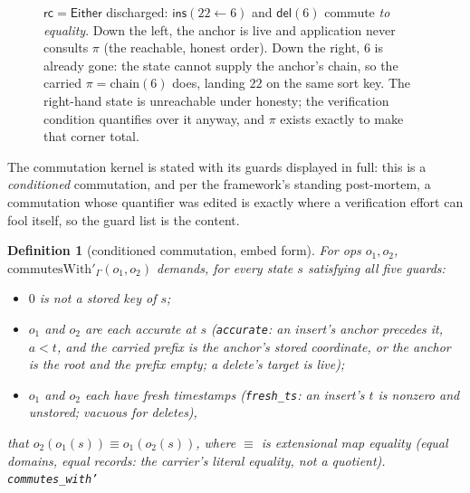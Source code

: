 \documentclass[11pt]{article}
\newtheorem{definition}[theorem]{Definition}
\newcommand{\rcrel}{\mathsf{rc}}                 %
\newcommand{\lean}[1]{\texttt{#1}}
\newcommand{\del}{\mathsf{del}}
\newcommand{\ins}{\mathsf{ins}}
\newcommand{\Either}{\textsf{Either}}
\newcommand{\chain}{\mathrm{chain}}
\begin{document}
\begin{figure}[h]
\centering
{}
\caption{$\rcrel = \Either$ discharged: $\ins(22 \leftarrow 6)$ and
$\del(6)$ commute \emph{to equality}. Down the left, the anchor is
live and application never consults $\pi$ (the reachable, honest
order). Down the right, $6$ is already gone: the state cannot
supply the anchor's chain, so the carried $\pi = \chain(6)$ does,
landing $22$ on the same sort key. The right-hand state is
unreachable under honesty; the verification condition quantifies
over it anyway, and $\pi$ exists exactly to make that corner total.}
\label{fig:commute}
\end{figure}

The commutation kernel is stated with its guards displayed in full:
this is a \emph{conditioned} commutation, and per the framework's
standing post-mortem, a commutation whose quantifier was edited is
exactly where a verification effort can fool itself, so the guard
list is the content.

\begin{definition}[conditioned commutation, embed form]
\label{def:embedcomm}
For ops $o_1, o_2$, $\mathrm{commutesWith}'_\Gamma(o_1, o_2)$
demands, for \emph{every} state $s$ satisfying all five guards:
\begin{itemize}[leftmargin=2em]
\item $0$ is not a stored key of $s$;
\item $o_1$ and $o_2$ are each \emph{accurate} at $s$
  (\lean{accurate}: an insert's anchor precedes it, $a < t$, and the
  carried prefix is the anchor's stored coordinate, or the anchor is
  the root and the prefix empty; a delete's target is live);
\item $o_1$ and $o_2$ each have \emph{fresh} timestamps
  (\lean{fresh\_ts}: an insert's $t$ is nonzero and unstored;
  vacuous for deletes),
\end{itemize}
that $o_2(o_1(s)) \equiv o_1(o_2(s))$, where $\equiv$ is extensional
map equality (equal domains, equal records: the carrier's literal
equality, not a quotient).
\hfill\lean{commutes\_with'}
\end{definition}
\end{document}

